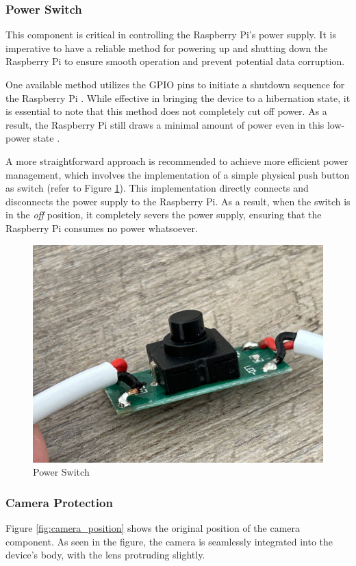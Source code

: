 \subsubsection{Power Switch}
This component is critical in controlling the Raspberry Pi's power supply. It is imperative to have a reliable method for powering up and shutting down the Raspberry Pi to ensure smooth operation and prevent potential data corruption.

One available method utilizes the GPIO pins to initiate a shutdown sequence for the Raspberry Pi \cite{Labidi21}. While effective in bringing the device to a hibernation state, it is essential to note that this method does not completely cut off power. As a result, the Raspberry Pi still draws a minimal amount of power even in this low-power state \cite{jdb}.

A more straightforward approach is recommended to achieve more efficient power management, which involves the implementation of a simple physical push button as switch (refer to Figure \ref{fig:power_switch}). This implementation directly connects and disconnects the power supply to the Raspberry Pi. As a result, when the switch is in the \textit{off} position, it completely severs the power supply, ensuring that the Raspberry Pi consumes no power whatsoever.

\begin{figure}[!ht]
    \centering
    \includegraphics[height=5 cm]{texs/Part1/chapter4/image/d00.jpg}
    \caption{Power Switch}
    \label{fig:power_switch}
\end{figure}

\subsubsection{Camera Protection}
Figure \ref{fig:camera_position} shows the original position of the camera component. As seen in the figure, the camera is seamlessly integrated into the device's body, with the lens protruding slightly.

